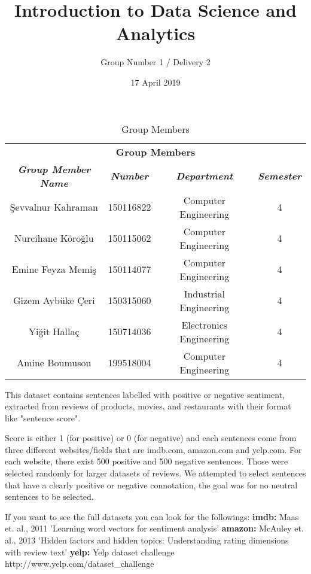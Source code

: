 \documentclass{article}
\title{Introduction to Data Science and Analytics}
\author{Group Number 1 / Delivery 2}
\date{17 April 2019}
\begin{document}
\maketitle


\begin{table}[htbp]
\caption{Group Members}
\begin{center}
\begin{tabular}{|c|c|c|c|}
\hline
\multicolumn{4}{|c|}{\textbf{Group Members}} \\
\cline{1-4} 
\textbf{\textit{Group Member Name}}&
\textbf{\textit{Number}}&
\textbf{\textit{Department}}&
\textbf{\textit{Semester}} \\
\hline
Şevvalnur Kahraman & 150116822 & Computer Engineering & 4 \\
\hline
Nurcihane Köroğlu & 150115062 & Computer Engineering & 4 \\
\hline
Emine Feyza Memiş & 150114077 & Computer Engineering & 4 \\
\hline
Gizem Aybüke Çeri & 150315060 & Industrial Engineering & 4 \\
\hline
Yiğit Hallaç & 150714036 & Electronics Engineering & 4 \\
\hline
Amine Boumusou & 199518004 & Computer Engineering & 4 \\
\hline
\end{tabular}
\label{tab1}
\end{center}
\end{table}

 
\setlength{\parindent}{4em}
\setlength{\parskip}{1em}
\renewcommand{\baselinestretch}{2.0}
 

This dataset contains sentences labelled with positive or negative sentiment, extracted from reviews of products, movies, and restaurants with their format like "sentence score". 
 
Score is either 1 (for positive) or 0 (for negative) and each sentences come from three different websites/fields that are imdb.com, amazon.com and yelp.com. For each website, there exist 500 positive and 500 negative sentences. Those were selected randomly for larger datasets of reviews. We attempted to select sentences that have a clearly positive or negative connotation, the goal was for no neutral sentences to be selected. 

If you want to see the full datasets you can look for the followings:
\textbf{imdb:} Maas et. al., 2011 'Learning word vectors for sentiment analysis'
\newline \textbf{amazon:} McAuley et. al., 2013 'Hidden factors and hidden topics: Understanding rating dimensions with review text'
\newline \textbf{yelp:} Yelp dataset challenge http://www.yelp.com/dataset\_challenge
\end{document}
